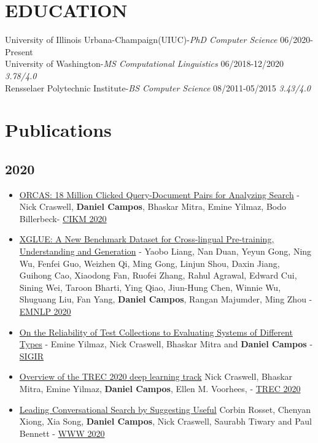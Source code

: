 \documentclass[line,margin]{res}
\begin{document}
\address{707 S Birch Street, Urbana, Il (415)-272-9964 |\href{mailto:spacemanidol@gmail.com}{dcampos3@illinois.edu}|
\href{https://spacemanidol.github.io/}{https://spacemanidol.github.io/}}
\begin{resume}
\section{EDUCATION}
University of Illinois Urbana-Champaign(UIUC)-{\sl PhD Computer Science} 06/2020-Present\\
University of Washington-{\sl MS Computational Linguistics} 06/2018-12/2020 {\sl 3.78/4.0} \\
Rensselaer Polytechnic Institute-{\sl BS Computer Science} 08/2011-05/2015  {\sl 3.43/4.0}
\section{Publications}
\subsection{2020}
\begin{itemize}
\itemsep -2pt
    \item \href{https://arxiv.org/abs/2006.05324}{ORCAS: 18 Million Clicked Query-Document Pairs for Analyzing Search} - Nick Craswell, \textbf{Daniel Campos}, Bhaskar Mitra, Emine Yilmaz, Bodo Billerbeck- \href{https://www.cikm2020.org/}{CIKM 2020}
    \item \href{https://arxiv.org/abs/2004.01401}{XGLUE: A New Benchmark Dataset for Cross-lingual Pre-training, Understanding and Generation} - Yaobo Liang, Nan Duan, Yeyun Gong, Ning Wu, Fenfei Guo, Weizhen Qi, Ming Gong, Linjun Shou, Daxin Jiang, Guihong Cao, Xiaodong Fan, Ruofei Zhang, Rahul Agrawal, Edward Cui, Sining Wei, Taroon Bharti, Ying Qiao, Jiun-Hung Chen, Winnie Wu, Shuguang Liu, Fan Yang, \textbf{Daniel Campos}, Rangan Majumder, Ming Zhou - \href{https://2020.emnlp.org/}{EMNLP 2020}
    \item \href{https://arxiv.org/pdf/2004.13486.pdf}{On the Reliability of Test Collections to Evaluating Systems of Different Types} - Emine Yilmaz, Nick Craswell, Bhaskar Mitra and \textbf{Daniel Campos} - \href{https://sigir.org/sigir2020/}{SIGIR} 
    \item \href{https://arxiv.org/abs/2003.07820}{Overview of the TREC 2020 deep learning track} Nick Craswell, Bhaskar Mitra, Emine Yilmaz, \textbf{Daniel Campos}, Ellen M. Voorhees, - \href{https://trec.nist.gov/tracks.html}{TREC 2020}
	\item \href{https://www.microsoft.com/en-us/research/publication/leading-conversational-search-by-suggesting-useful-questions/}{Leading Conversational Search by Suggesting Useful} Corbin Rosset, Chenyan Xiong, Xia Song, \textbf{Daniel Campos}, Nick Craswell, Saurabh Tiwary and Paul Bennett - \href{https://www2020.thewebconf.org/}{WWW 2020}
\end{itemize}

\end{resume}
\end{document}
